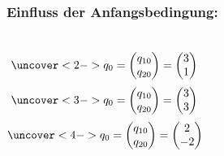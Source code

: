 \documentclass[ngerman, aspectratio=169, xcolor={rgb}]{beamer}
\begin{document}
\begin{frame}
	\frametitle{Einfluss der Anfangsbedingung:}
	\begin{columns}
		\begin{equation*}
			\uncover<2->{q_0 =
				\begin{pmatrix}
					q_{10} \\
					q_{20}
				\end{pmatrix}
				=
				\begin{pmatrix}
					3 \\
					1
				\end{pmatrix}
			}
		\end{equation*}
		\begin{equation*}
			\uncover<3->{q_0 =
				\begin{pmatrix}
					q_{10} \\
					q_{20}
				\end{pmatrix}
				=
				\begin{pmatrix}
					3 \\
					3
				\end{pmatrix}
			}
		\end{equation*}
		\begin{equation*}
			\uncover<4->{q_0 =
				\begin{pmatrix}
					q_{10} \\
					q_{20}
				\end{pmatrix}
				=
				\begin{pmatrix}
					2 \\
					-2
				\end{pmatrix}
			}
		\end{equation*}
		\scalebox{0.8}{}
	\end{columns}
\end{frame}
\end{document}
